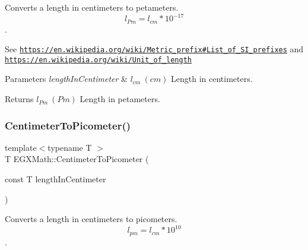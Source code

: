 Converts a length in centimeters to petameters. \[ l_{Pm}=l_{cm} * 10^{-17} \]. 

See \href{https://en.wikipedia.org/wiki/Metric_prefix#List_of_SI_prefixes}{\tt https\+://en.\+wikipedia.\+org/wiki/\+Metric\+\_\+prefix\#\+List\+\_\+of\+\_\+\+S\+I\+\_\+prefixes} and \href{https://en.wikipedia.org/wiki/Unit_of_length}{\tt https\+://en.\+wikipedia.\+org/wiki/\+Unit\+\_\+of\+\_\+length} 
\begin{DoxyParams}{Parameters}
{\em length\+In\+Centimeter} & $ l_{cm}\ (cm)$ Length in centimeters. \\
\hline
\end{DoxyParams}
\begin{DoxyReturn}{Returns}
$ l_{Pm}\ (Pm)$ Length in petameters. 
\end{DoxyReturn}
\mbox{\label{group___e_g_x_math-_conversions-_length_conversions-_centimeter-_s_i_ga7e2851b0052f1b135a84aa860495e4ba}} 
\subsubsection{\texorpdfstring{Centimeter\+To\+Picometer()}{CentimeterToPicometer()}}
{\footnotesize\ttfamily template$<$typename T $>$ \\
T E\+G\+X\+Math\+::\+Centimeter\+To\+Picometer (\begin{DoxyParamCaption}\item[{const T}]{length\+In\+Centimeter }\end{DoxyParamCaption})}



Converts a length in centimeters to picometers. \[ l_{pm}=l_{cm} * 10^{10} \]. 

